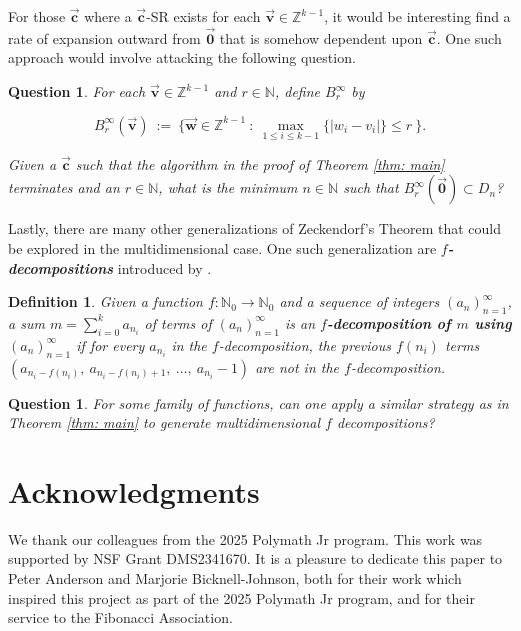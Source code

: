 \documentclass[]{interact}
\newcommand{\N}{{\mathbb N}}  %
\newcommand{\Z}{{\mathbb Z}}  %
\newcommand{\vtr}[1]{\vec{\mathbf{#1}}}
\theoremstyle{plain}
\numberwithin{equation}{section} %
\newtheorem{definition}[thm]{Definition}
\newtheorem{question}[thm]{Question}
\numberwithin{table}{section} %
\numberwithin{figure}{section}
\begin{document}
For those $\vtr{c}$ where a $\vtr{c}$-SR exists for each $\vtr{v}\in \Z^{k-1}$, it would be interesting find a rate of expansion outward from $\vtr{0}$ that is somehow dependent upon $\vtr{c}$. One such approach would involve attacking the following question.

\begin{question}\label{qu: expanding balls}
    For each $\vtr{v}\in \Z^{k-1}$ and $r\in \mathbb{N}$, define $B^{\infty}_r$ by

    $$B^{\infty}_r(\vtr{v})\ :=\ \{\vtr{w}\in \Z^{k-1}\ :\ \max_{1\leq i\leq k-1}\{|w_i-v_i|\}\leq r\ \}.$$
    
    \noindent Given a $\vtr{c}$ such that the algorithm in the proof of Theorem \textcolor{blue}{\ref{thm: main}} terminates and an $r\in \N$, what is the minimum $n\in \N$ such that $B^\infty_r(\vtr{0})\subset D_n$?
\end{question}

Lastly, there are many other generalizations of Zeckendorf's Theorem that could be explored in the multidimensional case. One such generalization are \textbf{\textit{$f$-decompositions}} introduced by \textcolor{blue}{\cite{DDKMMV14}}.

\begin{definition}\label{def: f-decomps}
    Given a function $f:\N_0 \rightarrow \N_0$ and a sequence of integers $(a_n)_{n=1}^\infty$, a sum $m = \sum_{i=0}^k a_{n_i}$ of terms of $(a_n)_{n=1}^\infty$ is an \textit{\textbf{$f$-decomposition of $m$ using $(a_n)_{n=1}^\infty$}} if for every $a_{n_i}$ in the $f$-decomposition, the previous $f(n_i)$ terms $(a_{n_i - f(n_i)},\ a_{n_i - f(n_i)+1},\  \ldots,\ a_{n_i}-1)$ are not in the $f$-decomposition.
\end{definition}

\begin{question}{\label{Qu: f-decomps}}
    For some family of functions, can one apply a similar strategy as in Theorem \textcolor{blue}{\ref{thm: main}} to generate multidimensional $f$ decompositions?
\end{question}

\section*{Acknowledgments}

We thank our colleagues from the 2025 Polymath Jr program. This work was supported by NSF Grant DMS2341670. It is a pleasure to dedicate this paper to Peter Anderson and Marjorie Bicknell-Johnson, both for their work which inspired this project as part of the 2025 Polymath Jr program, and for their service to the Fibonacci Association.
\end{document}
